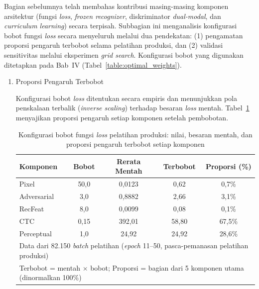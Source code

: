 Bagian sebelumnya telah membahas kontribusi masing-masing komponen arsitektur (fungsi \textit{loss}, \textit{frozen recognizer}, diskriminator \textit{dual-modal}, dan \textit{curriculum learning}) secara terpisah. Subbagian ini menganalisis konfigurasi bobot fungsi \textit{loss} secara menyeluruh melalui dua pendekatan: (1) pengamatan proporsi pengaruh terbobot selama pelatihan produksi, dan (2) validasi sensitivitas melalui eksperimen \textit{grid search}. Konfigurasi bobot yang digunakan ditetapkan pada Bab~IV (Tabel~\ref{table:optimal_weights}).

\begin{enumerate}[leftmargin=1.5em, labelsep=0.5em, itemindent=0pt, label=\arabic*., topsep=0pt, partopsep=0pt]
    \item Proporsi Pengaruh Terbobot
    
    Konfigurasi bobot \textit{loss} ditentukan secara empiris dan menunjukkan pola penskalaan terbalik (\textit{inverse scaling}) terhadap besaran \textit{loss} mentah. Tabel~\ref{tab:loss-weights-config} menyajikan proporsi pengaruh setiap komponen setelah pembobotan.

    \begin{table}[!htbp]
        \caption[Konfigurasi bobot \textit{loss} produksi]{Konfigurasi bobot fungsi \textit{loss} pelatihan produksi: nilai, besaran mentah, dan proporsi pengaruh terbobot setiap komponen}
        \label{tab:loss-weights-config}
        \normalsize
        \begin{tabular*}{\textwidth}{@{\extracolsep{\fill}}lcccc@{}}
            \hline
            \textbf{Komponen}    & \textbf{Bobot} & \textbf{Rerata Mentah} & \textbf{Terbobot} & \textbf{Proporsi (\%)}   \\
            \hline
            Pixel       & 50,0  & 0,0123     & 0,62       & 0,7\%   \\
            Adversarial & 3,0   & 0,8882     & 2,66       & 3,1\%   \\
            RecFeat     & 8,0   & 0,0099     & 0,08       & 0,1\%   \\
            CTC         & 0,15  & 392,01     & 58,80      & 67,5\%  \\
            Perceptual  & 1,0   & 24,92      & 24,92      & 28,6\%  \\
            \hline
            \multicolumn{5}{l}{\small Data dari 82.150 \textit{batch} pelatihan (\textit{epoch} 11--50, pasca-pemanasan pelatihan produksi)}   \\
            \multicolumn{5}{l}{\small Terbobot = mentah $\times$ bobot; Proporsi = bagian dari 5 komponen utama (dinormalkan 100\%)} \\
        \end{tabular*}
    \end{table}


\end{enumerate}
